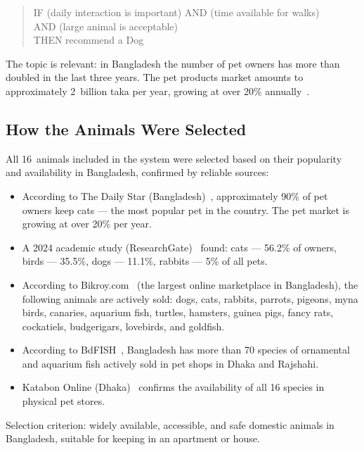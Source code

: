 \documentclass[a4paper,final]{article}
\begin{document}
\begin{quote}
IF (daily interaction is important) AND (time available for walks)\\
AND (large animal is acceptable)\\
THEN recommend a Dog
\end{quote}

The topic is relevant: in Bangladesh the number of pet owners has more than doubled in the last three years. The pet products market amounts to approximately 2~billion taka per year, growing at over 20\% annually~\cite{dailystar}.

\subsection*{How the Animals Were Selected}

All 16~animals included in the system were selected based on their popularity and availability in Bangladesh, confirmed by reliable sources:

\begin{itemize}
	\item According to The Daily Star (Bangladesh)~\cite{dailystar}, approximately 90\% of pet owners keep cats --- the most popular pet in the country. The pet market is growing at over 20\% per year.

	\item A 2024 academic study (ResearchGate)~\cite{researchgate1} found: cats --- 56.2\% of owners, birds --- 35.5\%, dogs --- 11.1\%, rabbits --- 5\% of all pets.

	\item According to Bikroy.com~\cite{bikroy} (the largest online marketplace in Bangladesh), the following animals are actively sold: dogs, cats, rabbits, parrots, pigeons, myna birds, canaries, aquarium fish, turtles, hamsters, guinea pigs, fancy rats, cockatiels, budgerigars, lovebirds, and goldfish.

	\item According to BdFISH~\cite{bdfish}, Bangladesh has more than 70 species of ornamental and aquarium fish actively sold in pet shops in Dhaka and Rajshahi.

	\item Katabon Online (Dhaka)~\cite{katabon} confirms the availability of all 16 species in physical pet stores.
\end{itemize}

Selection criterion: widely available, accessible, and safe domestic animals in Bangladesh, suitable for keeping in an apartment or house.
\end{document}
